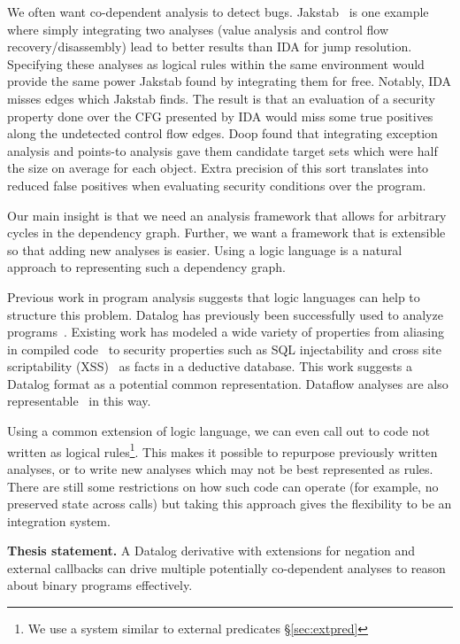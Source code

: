 We often want co-dependent analysis to detect bugs.
Jakstab~\cite{jakstab} is one example where simply integrating two analyses (value analysis and control flow recovery/disassembly) lead to better results than IDA\cite{ida} for jump resolution.
Specifying these analyses as logical rules within the same environment would provide the same power Jakstab found by integrating them for free.
Notably, IDA misses edges which Jakstab finds.
The result is that an evaluation of a security property done over the CFG presented by IDA would miss some true positives along the undetected control flow edges.
Doop\cite{doop1} found that integrating exception analysis and points-to analysis gave them candidate target sets which were half the size on average for each object.
Extra precision of this sort translates into reduced false positives when evaluating security conditions over the program.

Our main insight is that we need an analysis framework that allows for arbitrary cycles in the dependency graph.
Further, we want a framework that is extensible so that adding new analyses is easier.
Using a logic language is a natural approach to representing such a dependency graph.

Previous work in program analysis suggests that logic languages can help to structure this problem.
Datalog has previously been successfully used to analyze programs~\cite{lam2005,brumley2006,alpuente2011,doop1,bddbddb}.
Existing work has modeled a wide variety of properties from aliasing in compiled code~\cite{brumley2006} to security properties such as SQL injectability and cross site scriptability (XSS)~\cite{lam2005} as facts in a deductive database.
This work suggests a Datalog format as a potential common representation.
Dataflow analyses are also representable~\cite{mcallester2002} in this way.

Using a common extension of logic language, we can even call out to code not written as logical rules\footnote{We use a system similar to external predicates \S\ref{sec:extpred}}.
This makes it possible to repurpose previously written analyses, or to write new analyses which may not be best represented as rules.
There are still some restrictions on how such code can operate (for example, no preserved state across calls) but taking this approach gives the flexibility to be an integration system.

\begin{inset}
{\bf Thesis statement.}
A Datalog derivative with extensions for negation and external callbacks can drive multiple potentially co-dependent analyses to reason about binary programs effectively.
\end{inset}

